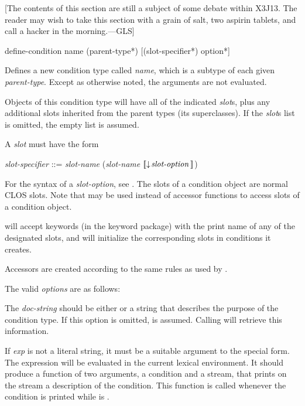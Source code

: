 [The contents of this section are still a subject of some debate within X3J13.
The reader may wish to take this section with a grain of salt, two aspirin
tablets, and call a hacker in the morning.---GLS]

\begin{defmac}
define-condition name ({parent-type}*)
                 [({slot-specifier}*) {option}*]

  Defines a new condition type called \emph{name}, which is a subtype of each given
  \emph{parent-type}.  Except as otherwise noted, the arguments are not evaluated.

  Objects of this condition type will have all of the indicated \emph{slot\/}s, plus
  any additional slots inherited from the parent types (its superclasses).
  If the \emph{slot\/}s list is omitted, the empty list is assumed.

  A \emph{slot} must have the form
\begin{tabbing}
\emph{slot-specifier\/} ::= \emph{slot-name\/} {\Mor} (\emph{slot-name\/}  $\lbrack\!\lbrack\downarrow\!\hbox{\emph{slot-option}}\,\rbrack\!\rbrack$)
\end{tabbing}
For the syntax of a \emph{slot-option}, see .
The slots of a condition object are normal CLOS slots.
Note that  may be used instead of accessor functions to access slots of a
condition object.

   will accept keywords (in the keyword package) with the
  print name of any of the designated slots, and will initialize the
  corresponding slots in conditions it creates.

  Accessors are created according to the same rules as used by .

  The valid \emph{options} are as follows:

\begin{flushdesc}
\item[\cd{(:documentation \emph{doc-string})}]

     The \emph{doc-string} should be either  or
     a string that describes the purpose of the
     condition type. If this option is omitted,  is assumed.
     Calling  will retrieve this information.

\item[\cd{(:report \emph{exp})}]

     If \emph{exp} is not a literal string, it must be a suitable argument to the
      special form. The expression  will be evaluated
     in the current lexical environment. It should produce a function of two
     arguments, a condition and a stream, that prints on the stream a
     description of the condition. This function is called whenever the
     condition is printed while  is .


\end{flushdesc}
\end{defmac}
